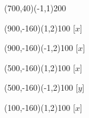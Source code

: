 \documentclass[12pt]{article}
\begin{document}
\begin{figure}[htb]
\begin{egame}
\putbranch(700,40)(-1,1){200}

\renewcommand{\egarrowstyle}{}

\putbranch(900,-160)(1,2){100}
[$x$]

\renewcommand{\egarrowstyle}{e}

\putbranch(900,-160)(-1,2){100}
[$x$]

\renewcommand{\egarrowstyle}{}

\putbranch(500,-160)(1,2){100}
[$x$]

\renewcommand{\egarrowstyle}{e}

\putbranch(500,-160)(-1,2){100}
[$y$]

\renewcommand{\egarrowstyle}{}

\putbranch(100,-160)(1,2){100}
[$x$]

\renewcommand{\egarrowstyle}{e}


\end{egame}
\end{figure}
\end{document}
